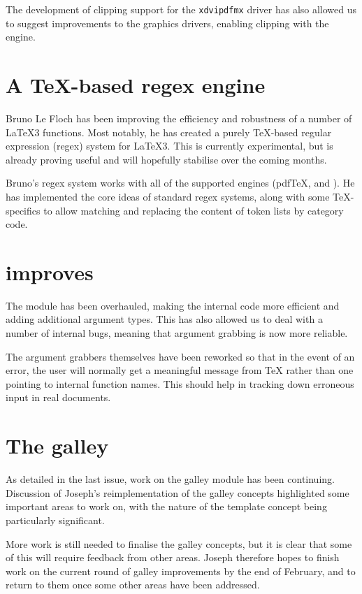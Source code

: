 \documentclass{ltnews}
\begin{document}
The development of clipping support for the \texttt{xdvipdfmx} driver has also allowed
us to suggest improvements to the \LaTeXe{} graphics drivers, enabling clipping
with the \XeTeX{} engine.

\section{A \TeX{}-based regex engine}

Bruno Le Floch has been %
improving the efficiency
and robustness of a number of \LaTeX3 functions. Most notably, he has
created a purely \TeX{}-based regular expression (regex) system for \LaTeX3.
This is currently experimental, but is already proving useful and will
hopefully stabilise over the coming months.

Bruno's regex system works with all of the supported engines (pdf\TeX{},
\XeTeX{} and \LuaTeX{}). He has implemented the core ideas of standard
regex systems, along with some \TeX{}-specifics to allow matching and
replacing
the content of token lists %
by category code.

\section{ improves}

The  module has been overhauled, making the internal code
more efficient and adding additional argument types. This has also allowed
us to deal with a number of internal bugs, meaning that argument grabbing
is now more reliable.

The argument grabbers themselves have been reworked so that in the event of an error,
the user will normally get a meaningful message from \TeX{} rather than
one pointing to  internal function names. This should help
in tracking down erroneous input in real documents.

\section{The galley}

As detailed in the last issue, work on the galley module has been continuing.
Discussion of Joseph's reimplementation of the galley concepts highlighted
some important areas to work on, with the nature of the template concept
being particularly significant.

More work is still needed to finalise the galley concepts, but it is clear that
some of this will require feedback from other areas. Joseph therefore hopes
to finish work on the current round of galley improvements by the end of
February, and to return to them once some other areas have been addressed.
\end{document}
